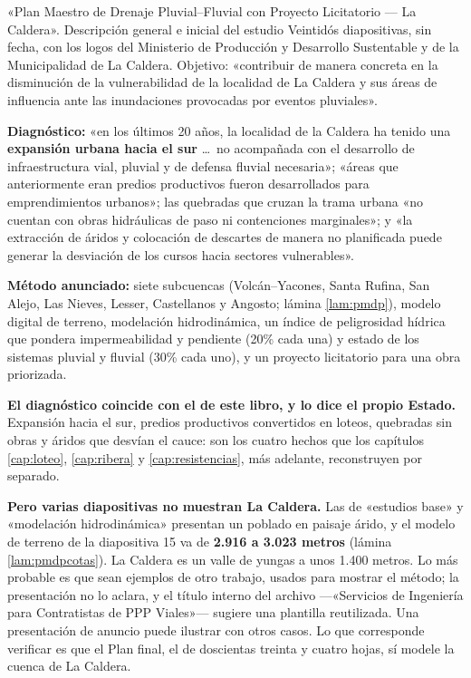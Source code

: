 \begin{ficha}{«Plan Maestro de Drenaje Pluvial--Fluvial con Proyecto Licitatorio --- La Caldera». Descripción general e inicial del estudio}
Veintidós diapositivas, sin fecha, con los logos del Ministerio de Producción y Desarrollo Sustentable y de la Municipalidad de La Caldera. Objetivo: «contribuir de manera concreta en la disminución de la vulnerabilidad de la localidad de La Caldera y sus áreas de influencia ante las inundaciones provocadas por eventos pluviales».

\textbf{Diagnóstico:} «en los últimos 20 años, la localidad de la Caldera ha tenido una \textbf{expansión urbana hacia el sur} \ldots\ no acompañada con el desarrollo de infraestructura vial, pluvial y de defensa fluvial necesaria»; «áreas que anteriormente eran predios productivos fueron desarrollados para emprendimientos urbanos»; las quebradas que cruzan la trama urbana «no cuentan con obras hidráulicas de paso ni contenciones marginales»; y «la extracción de áridos y colocación de descartes de manera no planificada puede generar la desviación de los cursos hacia sectores vulnerables».

\textbf{Método anunciado:} siete subcuencas (Volcán--Yacones, Santa Rufina, San Alejo, Las Nieves, Lesser, Castellanos y Angosto; lámina \ref{lam:pmdp}), modelo digital de terreno, modelación hidrodinámica, un índice de peligrosidad hídrica que pondera impermeabilidad y pendiente (20\% cada una) y estado de los sistemas pluvial y fluvial (30\% cada uno), y un proyecto licitatorio para una obra priorizada.
\end{ficha}

\begin{cautela}
\textbf{El diagnóstico coincide con el de este libro, y lo dice el propio Estado.} Expansión hacia el sur, predios productivos convertidos en loteos, quebradas sin obras y áridos que desvían el cauce: son los cuatro hechos que los capítulos \ref{cap:loteo}, \ref{cap:ribera} y \ref{cap:resistencias}, más adelante, reconstruyen por separado.

\textbf{Pero varias diapositivas no muestran La Caldera.} Las de «estudios base» y «modelación hidrodinámica» presentan un poblado en paisaje árido, y el modelo de terreno de la diapositiva 15 va de \textbf{2.916 a 3.023 metros} (lámina \ref{lam:pmdpcotas}). La Caldera es un valle de yungas a unos 1.400 metros. Lo más probable es que sean ejemplos de otro trabajo, usados para mostrar el método; la presentación no lo aclara, y el título interno del archivo ---«Servicios de Ingeniería para Contratistas de PPP Viales»--- sugiere una plantilla reutilizada. Una presentación de anuncio puede ilustrar con otros casos. Lo que corresponde verificar es que el Plan final, el de doscientas treinta y cuatro hojas, sí modele la cuenca de La Caldera.
\end{cautela}

